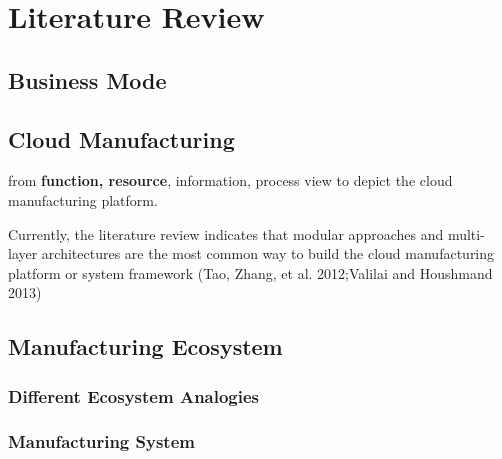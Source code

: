 \section{Literature Review} %
\label{sec:literature_review}

\subsection{Business Mode} %
\label{sub:business_mode}


\subsection{Cloud Manufacturing} %
\label{sub:cloud_manufacturing}
from \textbf{function, resource}, information, process view to depict the cloud manufacturing platform.

Currently, the literature review indicates that modular approaches and multi-layer architectures are the most common way to build the cloud manufacturing platform or system framework (Tao, Zhang, et al. 2012;Valilai and Houshmand 2013)

\subsection{Manufacturing Ecosystem} %
\label{sub:manufacturing_ecosystem}

\subsubsection{Different Ecosystem Analogies}

\subsubsection{Manufacturing System}

